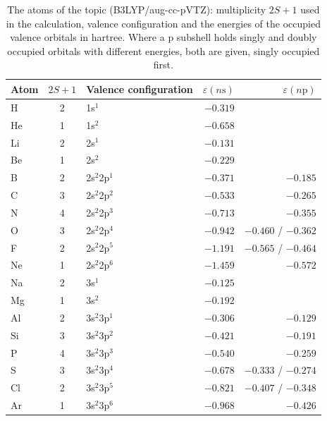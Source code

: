 \begin{table}[htb]
	\centering\small
	\caption{The atoms of the topic  (B3LYP/aug-cc-pVTZ): multiplicity $2S+1$ used in the calculation, valence configuration and the energies of the occupied valence orbitals in hartree. Where a p subshell holds singly and doubly occupied orbitals with different energies, both are given, singly occupied first.}
	\label{tab:pt-config}
	\begin{tabular}{lcl rr}
		\hline
		Atom & $2S+1$ & Valence configuration & $\varepsilon(n\mathrm{s})$ & $\varepsilon(n\mathrm{p})$ \\
		\hline
		H  & 2 & 1s$^1$         & $-0.319$ & \\
		He & 1 & 1s$^2$         & $-0.658$ & \\
		Li & 2 & 2s$^1$         & $-0.131$ & \\
		Be & 1 & 2s$^2$         & $-0.229$ & \\
		B  & 2 & 2s$^2$2p$^1$   & $-0.371$ & $-0.185$ \\
		C  & 3 & 2s$^2$2p$^2$   & $-0.533$ & $-0.265$ \\
		N  & 4 & 2s$^2$2p$^3$   & $-0.713$ & $-0.355$ \\
		O  & 3 & 2s$^2$2p$^4$   & $-0.942$ & $-0.460$ / $-0.362$ \\
		F  & 2 & 2s$^2$2p$^5$   & $-1.191$ & $-0.565$ / $-0.464$ \\
		Ne & 1 & 2s$^2$2p$^6$   & $-1.459$ & $-0.572$ \\
		Na & 2 & 3s$^1$         & $-0.125$ & \\
		Mg & 1 & 3s$^2$         & $-0.192$ & \\
		Al & 2 & 3s$^2$3p$^1$   & $-0.306$ & $-0.129$ \\
		Si & 3 & 3s$^2$3p$^2$   & $-0.421$ & $-0.191$ \\
		P  & 4 & 3s$^2$3p$^3$   & $-0.540$ & $-0.259$ \\
		S  & 3 & 3s$^2$3p$^4$   & $-0.678$ & $-0.333$ / $-0.274$ \\
		Cl & 2 & 3s$^2$3p$^5$   & $-0.821$ & $-0.407$ / $-0.348$ \\
		Ar & 1 & 3s$^2$3p$^6$   & $-0.968$ & $-0.426$ \\
		\hline
	\end{tabular}
\end{table}

